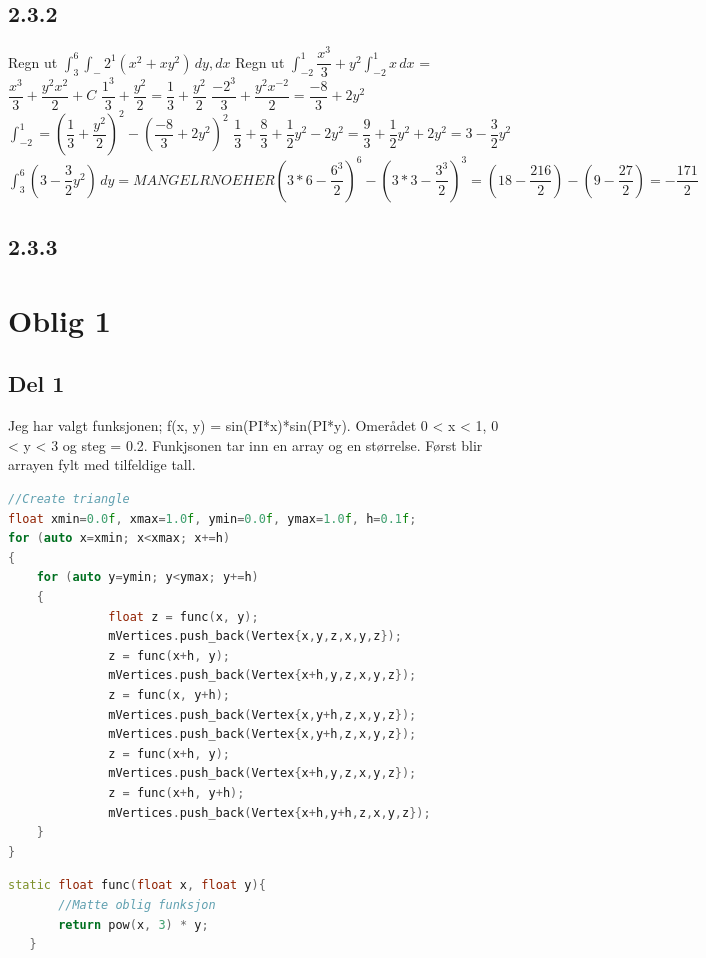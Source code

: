 \documentclass[a4paper,norsk]{article}
\begin{document}
\subsection{2.3.2}
Regn ut \(\int_3^6 \int_-2^1 (x^2 + xy^2) \,dy, dx\) \newline
Regn ut \(\int_{-2}^{1} \dfrac{x^3}{3} +y^2 \int_{-2}^{1} x \,dx\) = \( \dfrac{x^3}{3} + \dfrac{y^2x^2}{2} + C\)\newline
\( \dfrac{1^3}{3} + \dfrac{y^2}{2}  = \dfrac{1}{3} + \dfrac{y^2}{2}\) \newline
\( \dfrac{-2^3}{3} + \dfrac{y^2x^{-2}}{2}  = \dfrac{-8}{3} + 2y^2\) \newline
\(\int_{-2}^{1} = (\dfrac{1}{3} + \dfrac{y^2}{2})^2- (\dfrac{-8}{3} + 2y^2)^2\)\newline
\(\dfrac{1}{3} + \dfrac{8}{3} +\dfrac{1}{2} y^2 - 2y^2 =  \dfrac{9}{3} + \dfrac{1}{2}y^2+2y^2 = 3 - \dfrac{3}{2}y^2 \)\newline
 \(\int_3^6  (3 - \dfrac{3}{2}y^2 ) \,dy = MANGELR NOE HER (3*6 - \dfrac{6^3}{2})^6 - (3*3 - \dfrac{3^3}{2})^3 = (18 - \dfrac{216}{2}) - (9 - \dfrac{27}{2}) = -\dfrac{171}{2}\)

\subsection{2.3.3}


\section{Oblig 1}
\subsection{Del 1}
Jeg har valgt funksjonen; f(x, y) = sin(PI*x)*sin(PI*y). Omerådet 0 < x < 1, 0 < y < 3 og steg = 0.2.
Funkjsonen tar inn en array og en størrelse. Først blir arrayen fylt med tilfeldige tall. 
\begin{lstlisting}[language=C++, caption={trianglesurface.cpp}]
//Create triangle
float xmin=0.0f, xmax=1.0f, ymin=0.0f, ymax=1.0f, h=0.1f;
for (auto x=xmin; x<xmax; x+=h)
{
	for (auto y=ymin; y<ymax; y+=h)
	{
              float z = func(x, y);
              mVertices.push_back(Vertex{x,y,z,x,y,z});
              z = func(x+h, y);
              mVertices.push_back(Vertex{x+h,y,z,x,y,z});
              z = func(x, y+h);
              mVertices.push_back(Vertex{x,y+h,z,x,y,z});
              mVertices.push_back(Vertex{x,y+h,z,x,y,z});
              z = func(x+h, y);
              mVertices.push_back(Vertex{x+h,y,z,x,y,z});
              z = func(x+h, y+h);
              mVertices.push_back(Vertex{x+h,y+h,z,x,y,z});
	}
}
\end{lstlisting}
\begin{lstlisting}[language=C++, caption={trianglesurface.hh}]
static float func(float x, float y){
       //Matte oblig funksjon
       return pow(x, 3) * y;
   }
\end{lstlisting}
\end{document}
